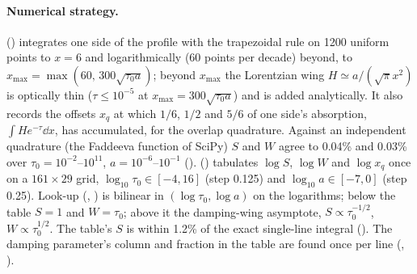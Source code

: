 \paragraph{Numerical strategy.}  ()
integrates one side of the profile with the trapezoidal rule on 1200 uniform
points to $x=6$ and logarithmically (60 points per decade) beyond, to
$x_{\max}=\max(60,\,300\sqrt{\tau_0 a})$; beyond $x_{\max}$ the Lorentzian wing
$H\simeq a/(\sqrt\pi x^2)$ is optically thin ($\tau\le10^{-5}$ at $x_{\max}=300\sqrt{\tau_0a}$)
and is added analytically. It also records the offsets $x_q$ at which $1/6$,
$1/2$ and $5/6$ of one side's absorption, $\int H e^{-\tau}\dd x$, has accumulated,
for the overlap quadrature. Against an independent quadrature (the Faddeeva
function of SciPy) $S$ and $W$ agree to 0.04\% and 0.03\% over
$\tau_0=10^{-2}$--$10^{11}$, $a=10^{-6}$--$10^{-1}$ (). 
() tabulates $\log S$, $\log W$ and $\log x_q$ once on a
$161\times29$ grid, $\log_{10}\tau_0\in[-4,16]$ (step 0.125) and
$\log_{10}a\in[-7,0]$ (step 0.25). Look-up (, )
is bilinear in $(\log\tau_0,\log a)$ on the logarithms; below the table $S=1$ and
$W=\tau_0$; above it the damping-wing asymptote, $S\propto\tau_0^{-1/2}$,
$W\propto\tau_0^{1/2}$. The table's $S$ is within 1.2\% of the exact single-line
integral (). The damping parameter's column and fraction in the table
are found once per line (, ).

